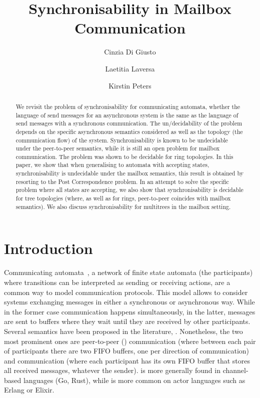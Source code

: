 \documentclass[submission,copyright,creativecommons,UKenglish]{eptcs}
\title{Synchronisability in Mailbox Communication}
\author{Cinzia {Di Giusto}
\institute{Université Côte d'Azur,\\ CNRS,I3S, France}
\and
Laetitia Laversa 
\institute{Université Sorbonne Paris Nord,\\ Paris, France}
\and
Kirstin Peters
\institute{Universität Augsburg,\\ Augsburg, Germany}
}
\begin{document}
\maketitle


\begin{abstract}
We revisit the problem of synchronisability for communicating automata, \ie whether the language of send messages for an asynchronous system is the same as the language of send messages with a synchronous communication. The un/decidability of the problem depends on the specific asynchronous semantics considered as well as the topology (the communication flow) of the  system. 
Synchronisability is known to be undecidable under the peer-to-peer semantics, while it is still an open problem for mailbox communication. The problem was shown to be decidable for ring topologies. In this paper, we show that when generalising to automata with accepting states, synchronisability is undecidable under the mailbox semantics, this result is obtained by resorting to the Post Correspondence problem. In an attempt to solve the specific problem where all states are accepting, we also show that synchronisability is decidable for tree topologies (where, as well as for rings, peer-to-peer coincides with mailbox semantics).
We also discuss synchronisability for multitrees in the mailbox setting.
\end{abstract}


\section{Introduction}


Communicating automata~\cite{brand_communicating_1983}, \ie a network of finite state automata (the participants) where transitions can be interpreted as sending or receiving actions, are a common way to model communication protocols.
This model allows to consider systems exchanging messages in either a synchronous or asynchronous way. While in the former case communication happens simultaneously, in the latter, messages are sent to buffers where they wait until they are received by other participants. Several semantics have been proposed in the literature, \eg  \cite{charron_synchronous_1996,chevrou_diversity_2016,digiusto_partial_2023}.
Nonetheless, the two most prominent ones are peer-to-peer (\Ptp) communication (where between each pair of participants there are two FIFO buffers, one per direction of communication) and  \Mailbox communication (where each participant has its own FIFO buffer that stores all received messages, whatever the sender). 
\Ptp is more generally found in channel-based languages (\eg Go, Rust), while \Mailbox is more common on actor languages such as Erlang or Elixir.
\end{document}
